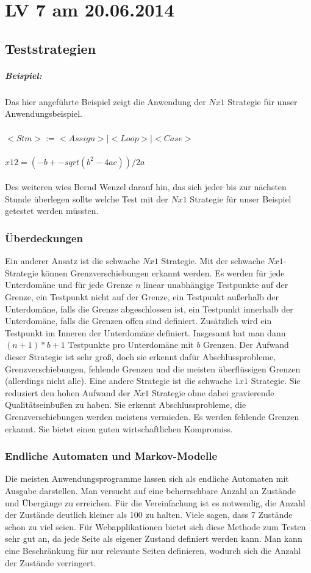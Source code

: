 \chapter{LV 7 am 20.06.2014}
\section{Teststrategien}
\paragraph{Beispiel:}
Das hier angeführte Beispiel zeigt die Anwendung der $Nx1$ Strategie für unser Anwendungsbeispiel.\\\\
$<Stm> := <Assign> | <Loop> | <Case>$\\\\
$x12 = (-b +- sqrt(b^2 - 4ac))/2a$\\\\
Des weiteren wies Bernd Wenzel darauf hin, das sich jeder bis zur nächsten Stunde überlegen sollte welche Test mit der $Nx1$ Strategie für unser Beispiel getestet werden müssten. 

\subsection{Überdeckungen}
Ein anderer Ansatz ist die schwache $Nx1$ Strategie. Mit der schwache $Nx1$-Strategie können Grenzverschiebungen erkannt werden. Es werden für jede Unterdomäne und für jede Grenze $n$ linear unabhängige Testpunkte auf der Grenze, ein Testpunkt nicht auf der Grenze, ein Testpunkt außerhalb der Unterdomäne, falls die Grenze abgeschlossen ist, ein Testpunkt innerhalb der Unterdomäne, falls die Grenzen offen sind definiert. Zusätzlich wird ein Testpunkt im Inneren der Unterdomäne definiert. Insgesamt hat man dann $(n+1)*b+1$ Testpunkte pro Unterdomäne mit $b$ Grenzen. Der Aufwand dieser Strategie ist sehr groß, doch sie erkennt dafür Abschlussprobleme, Grenzverschiebungen, fehlende Grenzen und die meisten überflüssigen Grenzen (allerdings nicht alle). 
Eine andere Strategie ist die schwache $1x1$ Strategie. Sie reduziert den hohen Aufwand der $Nx1$ Strategie ohne dabei gravierende Qualitätseinbußen zu haben. Sie erkennt Abschlussprobleme, die Grenzverschiebungen werden meistens vermieden. Es werden fehlende Grenzen erkannt. Sie bietet einen guten wirtschaftlichen Kompromiss.


\subsection{Endliche Automaten und Markov-Modelle}
Die meisten Anwendungsprogramme lassen sich als endliche Automaten mit Ausgabe darstellen. Man versucht auf eine beherrschbare Anzahl an Zustände und Übergänge zu erreichen. Für die Vereinfachung ist es notwendig, die Anzahl der Zustände deutlich kleiner als 100 zu halten. Viele sagen, dass 7 Zustände schon zu viel seien. Für Webapplikationen bietet sich diese Methode zum Testen sehr gut an, da jede Seite als eigener Zustand definiert werden kann. Man kann eine Beschränkung für nur relevante Seiten definieren, wodurch sich die Anzahl der Zustände verringert. 

